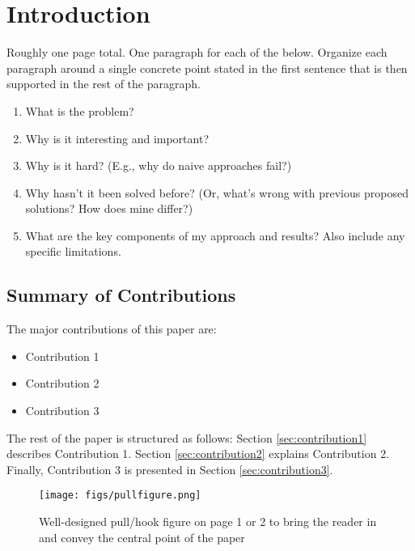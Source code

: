 \section{Introduction}
\label{introduction}



Roughly one page total. One paragraph for each of the below. Organize each paragraph around a single concrete point stated in the first sentence that is then supported in the rest of the paragraph.

\begin{enumerate}
\item What is the problem?
\item Why is it interesting and important?
\item Why is it hard? (E.g., why do naive approaches fail?)
\item Why hasn't it been solved before? (Or, what's wrong with previous proposed solutions? How does mine differ?)
\item What are the key components of my approach and results? Also include any specific limitations.
\end{enumerate}

\subsection{Summary of Contributions}
\label{contributionsummary}

The major contributions of this paper are:

\begin{itemize}
    \item Contribution 1
    \item Contribution 2
    \item Contribution 3
\end{itemize}

The rest of the paper is structured as follows: Section \ref{sec:contribution1} describes Contribution 1. Section \ref{sec:contribution2} explains Contribution 2. Finally, Contribution 3 is presented in Section \ref{sec:contribution3}.

\begin{figure}[h]
\centering
\begin{minipage}{0.55\linewidth}
    \centering
    \texttt{[image: figs/pullfigure.png]} 
\end{minipage}
\caption{Well-designed pull/hook figure on page 1 or 2 to bring the reader in and convey the central point of the paper}
\label{fig:system}
\end{figure}